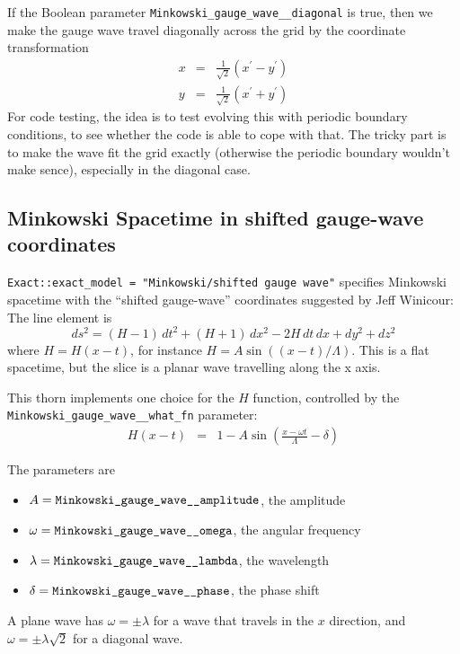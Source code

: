 If the Boolean parameter \verb|Minkowski_gauge_wave__diagonal| is true,
then we make the gauge wave travel diagonally across the grid by the
coordinate transformation
\begin{eqnarray}
x &=& \frac{1}{\sqrt{2}}(x^\prime - y^\prime)				\\
y &=& \frac{1}{\sqrt{2}}(x^\prime + y^\prime)				%
\end{eqnarray}
For code testing, the idea is to test evolving this with periodic boundary
conditions, to see whether the code is able to cope with that.
The tricky part is to make the wave fit the grid exactly (otherwise the
periodic boundary wouldn't make sence), especially in the diagonal case.


\subsection{Minkowski Spacetime in shifted gauge-wave coordinates}

\verb|Exact::exact_model = "Minkowski/shifted gauge wave"| specifies Minkowski
spacetime with the ``shifted gauge-wave'' coordinates suggested by
Jeff Winicour:
The line element is
\begin{equation}
ds^2 = (H-1)\, dt^2 + (H+1)\, dx^2 - 2H\, dt\, dx + dy^2 + dz^2
\end{equation}
where $H=H(x-t)$, for instance $H=A\sin\left((x-t)/\Lambda\right)$.
This is a flat spacetime, but the slice is a planar wave travelling
along the x axis.

This thorn implements one choice for the $H$ function, controlled by
the \verb|Minkowski_gauge_wave__what_fn| parameter:
\begin{eqnarray}
H(x-t)	&=& 1 - A \sin \left(\frac{x-\omega t}{\Lambda} - \delta\right)
\end{eqnarray}

The parameters are
\begin{itemize}
\item	$A = \verb|Minkowski_gauge_wave__amplitude|$, the amplitude
\item	$\omega = \verb|Minkowski_gauge_wave__omega|$, the angular frequency
\item	$\lambda = \verb|Minkowski_gauge_wave__lambda|$, the wavelength
\item	$\delta = \verb|Minkowski_gauge_wave__phase|$, the phase shift
\end{itemize}
A plane wave has $\omega = \pm \lambda$ for a wave that travels in the
$x$ direction, and $\omega = \pm \lambda \sqrt{2}$ for a diagonal
wave.

